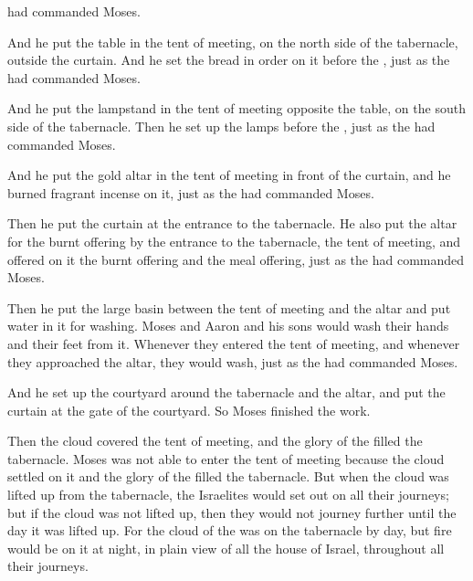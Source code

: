 {{}
had commanded
Moses.
\par }{\PP {}And he put
the table
in the tent
of meeting,
on
the north
side
of the tabernacle,
outside
the curtain.
And he set
the bread
in order
on
it before
the {}, just
as the
{}
had commanded
Moses.
\par }{\PP {}And he put
the lampstand
in the tent
of meeting
opposite
the table,
on
the south
side
of the tabernacle.
Then he set up
the lamps
before
the {}, just
as the
{}
had commanded
Moses.
\par }{\PP {}And he put
the
gold
altar
in the tent
of meeting
in front
of the curtain,
and he burned
fragrant
incense
on
it, just
as the
{}
had commanded
Moses.
\par }{\PP {}Then he put
the curtain
at the entrance
to the tabernacle.
He also put
the altar
for the burnt offering
by the entrance
to the tabernacle,
the tent
of meeting,
and offered
on
it the
burnt offering
and the
meal offering,
just
as the
{}
had commanded
Moses.
\par }{\PP {}Then he put
the large basin
between
the tent
of meeting
and the altar
and put
water
in it for washing.
Moses
and Aaron
and his sons
would wash
their hands
and their feet
from it.
Whenever they entered
the tent
of meeting,
and whenever they approached
the altar,
they would wash,
just
as the
{}
had commanded
Moses.
\par }{\PP {}And he set
up the courtyard
around
the tabernacle
and the altar,
and put
the
curtain
at the gate
of the courtyard.
So Moses
finished
the
work.
\par }{\PP {}Then the cloud
covered
the tent
of meeting,
and the glory
of the {}
filled
the tabernacle.
Moses
was not
able
to enter
the tent
of meeting
because
the cloud
settled
on
it and the glory
of the {}
filled
the
tabernacle.
But when the cloud
was lifted
up
from the tabernacle,
the Israelites
would set out on all
their journeys;
but if
the cloud
was not
lifted up,
then they would not
journey
further until
the day
it was lifted up.
For
the cloud
of the {}
was on
the tabernacle
by day,
but fire
would be
on it at night,
in plain view
of all
the house
of Israel,
throughout all
their journeys.

\par }